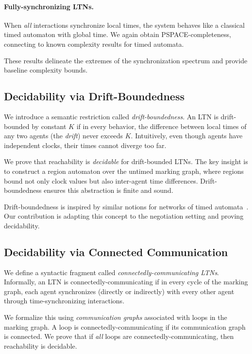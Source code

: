 \paragraph{Fully-synchronizing LTNs.} When \emph{all} interactions synchronize local times, the system behaves like a classical timed automaton with global time. We again obtain PSPACE-completeness, connecting to known complexity results for timed automata.

These results delineate the extremes of the synchronization spectrum and provide baseline complexity bounds.

\subsection{Decidability via Drift-Boundedness}

We introduce a semantic restriction called \emph{drift-boundedness}. An LTN is drift-bounded by constant $K$ if in every behavior, the difference between local times of any two agents (the \emph{drift}) never exceeds $K$. Intuitively, even though agents have independent clocks, their times cannot diverge too far.

We prove that reachability is \emph{decidable} for drift-bounded LTNs. The key insight is to construct a region automaton over the untimed marking graph, where regions bound not only clock values but also inter-agent time differences. Drift-boundedness ensures this abstraction is finite and sound.

Drift-boundedness is inspired by similar notions for networks of timed automata~\cite{DriftTA1,DriftTA2}. Our contribution is adapting this concept to the negotiation setting and proving decidability.

\subsection{Decidability via Connected Communication}

We define a syntactic fragment called \emph{connectedly-communicating LTNs}. Informally, an LTN is connectedly-communicating if in every cycle of the marking graph, each agent synchronizes (directly or indirectly) with every other agent through time-synchronizing interactions.

We formalize this using \emph{communication graphs} associated with loops in the marking graph. A loop is connectedly-communicating if its communication graph is connected. We prove that if \emph{all} loops are connectedly-communicating, then reachability is decidable.

